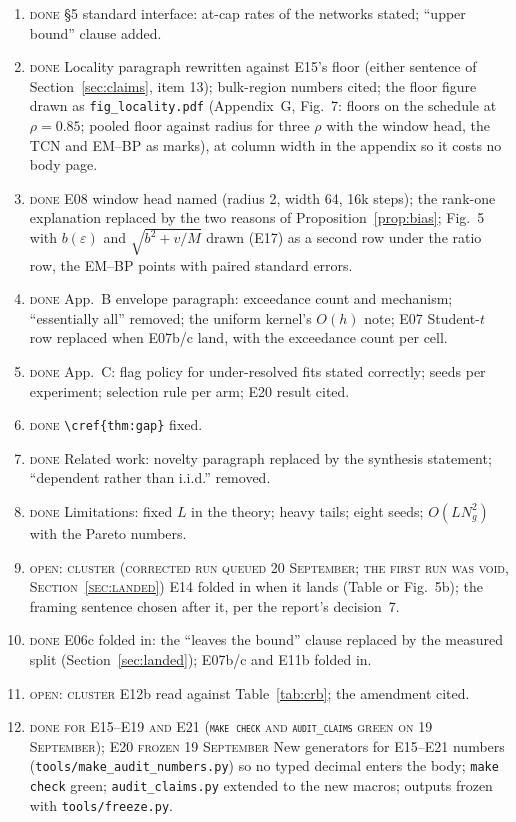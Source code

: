 \begin{enumerate}[label=$\square$, leftmargin=1.6em]
\item \textsc{done} \S5 standard interface: at-cap rates of the networks stated; ``upper bound'' clause added.
\item \textsc{done} Locality paragraph rewritten against E15's floor (either sentence of Section~\ref{sec:claims}, item 13); bulk-region numbers cited; the floor figure drawn as \texttt{fig\_locality.pdf} (Appendix~G, Fig.~7: floors on the schedule at $\rho=0.85$; pooled floor against radius for three $\rho$ with the window head, the TCN and EM--BP as marks), at column width in the appendix so it costs no body page.
\item \textsc{done} E08 window head named (radius 2, width 64, 16k steps); the rank-one explanation replaced by the two reasons of Proposition~\ref{prop:bias}; Fig.~5 with $b(\varepsilon)$ and $\sqrt{b^2+v/M}$ drawn (E17) as a second row under the ratio row, the EM--BP points with paired standard errors.
\item \textsc{done} App.~B envelope paragraph: exceedance count and mechanism; ``essentially all'' removed; the uniform kernel's $O(h)$ note; E07 Student-$t$ row replaced when E07b/c land, with the exceedance count per cell.
\item \textsc{done} App.~C: flag policy for under-resolved fits stated correctly; seeds per experiment; selection rule per arm; E20 result cited.
\item \textsc{done} \verb|\cref{thm:gap}| fixed.
\item \textsc{done} Related work: novelty paragraph replaced by the synthesis statement; ``dependent rather than i.i.d.'' removed.
\item \textsc{done} Limitations: fixed $L$ in the theory; heavy tails; eight seeds; $O(LN_g^2)$ with the Pareto numbers.
\item \textsc{open: cluster (corrected run queued 20 September; the first run was void, Section~\ref{sec:landed})} E14 folded in when it lands (Table or Fig.~5b); the framing sentence chosen after it, per the report's decision~7.
\item \textsc{done} E06c folded in: the ``leaves the bound'' clause replaced by the measured split (Section~\ref{sec:landed}); E07b/c and E11b folded in.
\item \textsc{open: cluster} E12b read against Table~\ref{tab:crb}; the amendment cited.
\item \textsc{done for E15--E19 and E21 (\texttt{make check} and \texttt{audit\_claims} green on 19 September); E20 frozen 19 September} New generators for E15--E21 numbers (\texttt{tools/make\_audit\_numbers.py}) so no typed decimal enters the body; \texttt{make check} green; \texttt{audit\_claims.py} extended to the new macros; outputs frozen with \texttt{tools/freeze.py}.

\end{enumerate}
